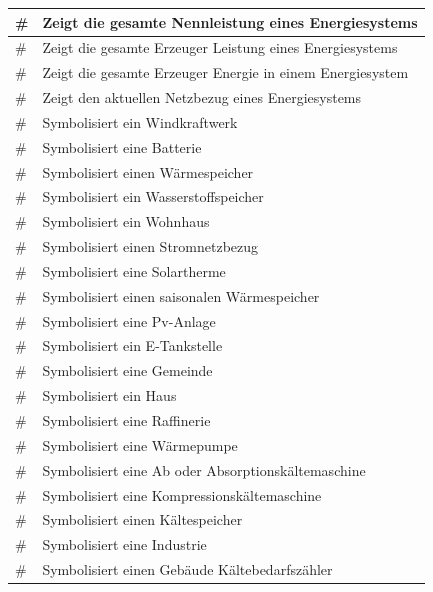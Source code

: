 \begin{table}[]
\begin{tabular}{|l|l|}
		\# & Zeigt die gesamte Nennleistung eines Energiesystems      \\ \hline
		\# & Zeigt die gesamte Erzeuger Leistung eines Energiesystems \\ \hline
		\# & Zeigt die gesamte Erzeuger Energie in einem Energiesystem                              \\ \hline
		\# & Zeigt den aktuellen Netzbezug eines Energiesystems       \\ \hline
		\# & Symbolisiert ein Windkraftwerk                           \\ \hline
		\# & Symbolisiert eine Batterie                               \\ \hline
		\# & Symbolisiert einen Wärmespeicher                         \\ \hline
		\# & Symbolisiert ein Wasserstoffspeicher                     \\ \hline
		\# & Symbolisiert ein Wohnhaus                                \\ \hline
		\# & Symbolisiert einen Stromnetzbezug                        \\ \hline
		\# & Symbolisiert eine Solartherme                            \\ \hline
		\# & Symbolisiert einen saisonalen Wärmespeicher              \\ \hline
		\# & Symbolisiert eine Pv-Anlage                              \\ \hline
		\# & Symbolisiert ein E-Tankstelle                            \\ \hline
		\# & Symbolisiert eine Gemeinde                               \\ \hline
		\# & Symbolisiert ein Haus                                    \\ \hline
		\# & Symbolisiert eine Raffinerie                             \\ \hline
		\# & Symbolisiert eine Wärmepumpe                             \\ \hline
		\# & Symbolisiert eine Ab oder Absorptionskältemaschine       \\ \hline
		\# & Symbolisiert eine Kompressionskältemaschine              \\ \hline
		\# & Symbolisiert einen Kältespeicher                         \\ \hline
		\# & Symbolisiert eine Industrie                              \\ \hline
		\# & Symbolisiert einen Gebäude Kältebedarfszähler            \\ \hline

\end{tabular}
\end{table}
